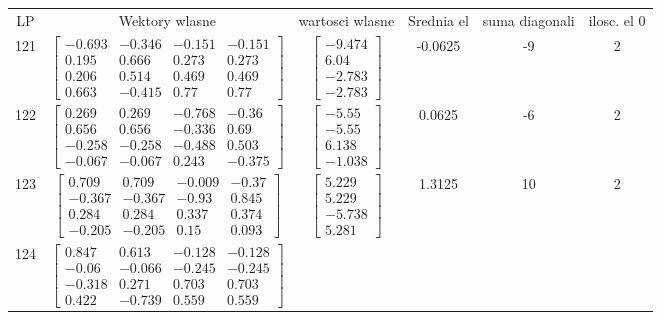 \documentclass[a4paper,12pt]{article}
\begin{document}
\bgroup {} \vspace{0.2in} \begin{tabular}{c c c c c c}
LP &Wektory wlasne & wartosci wlasne & Srednia el & suma diagonali & ilosc. el 0\\
121
&
$\begin{bmatrix} -0.693 & -0.346 & -0.151 & -0.151 \\ 0.195 & 0.666 & 0.273 & 0.273 \\ 0.206 & 0.514 & 0.469 & 0.469 \\ 0.663 & -0.415 & 0.77 & 0.77 \end{bmatrix}$
&
$\begin{bmatrix} -9.474 \\ 6.04 \\ -2.783 \\ -2.783 \end{bmatrix}$
&
-0.0625
&
-9
&
2
\\
122
&
$\begin{bmatrix} 0.269 & 0.269 & -0.768 & -0.36 \\ 0.656 & 0.656 & -0.336 & 0.69 \\ -0.258 & -0.258 & -0.488 & 0.503 \\ -0.067 & -0.067 & 0.243 & -0.375 \end{bmatrix}$
&
$\begin{bmatrix} -5.55 \\ -5.55 \\ 6.138 \\ -1.038 \end{bmatrix}$
&
0.0625
&
-6
&
2
\\
123
&
$\begin{bmatrix} 0.709 & 0.709 & -0.009 & -0.37 \\ -0.367 & -0.367 & -0.93 & 0.845 \\ 0.284 & 0.284 & 0.337 & 0.374 \\ -0.205 & -0.205 & 0.15 & 0.093 \end{bmatrix}$
&
$\begin{bmatrix} 5.229 \\ 5.229 \\ -5.738 \\ 5.281 \end{bmatrix}$
&
1.3125
&
10
&
2
\\
124
&
$\begin{bmatrix} 0.847 & 0.613 & -0.128 & -0.128 \\ -0.06 & -0.066 & -0.245 & -0.245 \\ -0.318 & 0.271 & 0.703 & 0.703 \\ 0.422 & -0.739 & 0.559 & 0.559 \end{bmatrix}$

\end{tabular}
\end{document}
